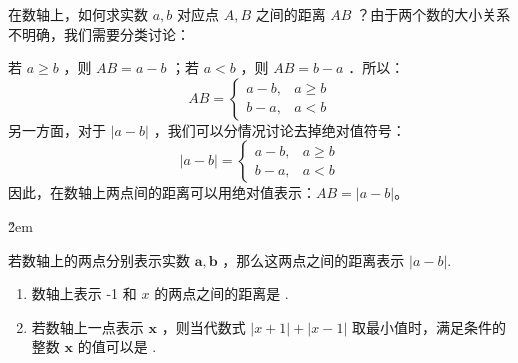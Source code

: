 \begin{theorem}[数轴上的距离]
    \begin{minipage}[c]{0.55\textwidth}
        在数轴上，如何求实数 $a, b$ 对应点 $A, B$ 之间的距离 $A B$ ？由于两个数的大小关系不明确，我们需要分类讨论：

        若 $a \geqslant b$ ，则 $A B=a-b$ ；若 $a<b$ ，则 $A B=b-a$ ．所以：
        $$
            A B= \begin{cases}a-b, & a \geqslant b \\ b-a, & a<b\end{cases}
        $$
        另一方面，对于 $|a-b|$ ，我们可以分情况讨论去掉绝对值符号：
        $$
            |a-b|= \begin{cases}a-b, & a \geqslant b \\ b-a, & a<b \end{cases}
        $$
        因此，在数轴上两点间的距离可以用绝对值表示：$AB = |a-b|$。
    \end{minipage}
    \hfill
    \begin{minipage}[c]{0.4\textwidth}
    \end{minipage}
\end{theorem}

\v{2em}

\begin{example}
    若数轴上的两点分别表示实数 $\boldsymbol{a}, \boldsymbol{b}$ ，那么这两点之间的距离表示 $|a-b|$.
    \begin{enumerate}
        \item 数轴上表示 -1 和 $x$ 的两点之间的距离是 \underline{\qquad}.
        \item 若数轴上一点表示 $\boldsymbol{x}$ ，则当代数式 $|x+1|+|x-1|$ 取最小值时，满足条件的整数 $\boldsymbol{x}$ 的值可以是 \underline{\qquad}.
    \end{enumerate}
\end{example}

